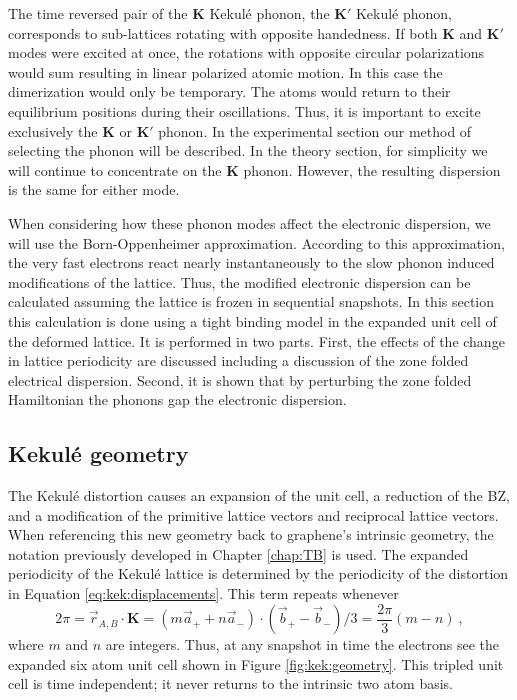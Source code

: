 The time reversed pair of the $\bm{K}$ Kekul\'e phonon, the $\bm{K'}$ Kekul\'e phonon, corresponds to sub-lattices rotating with opposite handedness.
If both $\bm{K}$ and $\bm{K'}$ modes were excited at once, the rotations with opposite circular polarizations would sum resulting in linear polarized atomic motion.
In this case the dimerization would only be temporary.
The atoms would return to their equilibrium positions during their oscillations.
Thus, it is important to excite exclusively the $\bm{K}$ or $\bm{K'}$ phonon.
In the experimental section our method of selecting the phonon will be described.
In the theory section, for simplicity we will continue to concentrate on the $\bm{K}$ phonon.
However, the resulting dispersion is the same for either mode. 

When considering how these phonon modes affect the electronic dispersion, we will use the Born-Oppenheimer approximation.
According to this approximation, the very fast electrons react nearly instantaneously to the slow phonon induced modifications of the lattice.
Thus, the modified electronic dispersion can be calculated assuming the lattice is frozen in sequential snapshots.
In this section this calculation is done using a tight binding model in the expanded unit cell of the deformed lattice.
It is performed in two parts.
First, the effects of the change in lattice periodicity are discussed including a discussion of the zone folded electrical dispersion.
Second, it is shown that by perturbing the zone folded Hamiltonian the phonons gap the electronic dispersion.

\subsection{Kekul\'e geometry}
The Kekul\'e distortion causes an expansion of the unit cell, a reduction of the BZ, and a modification of the primitive lattice vectors and reciprocal lattice vectors.
When referencing this new geometry back to graphene's intrinsic geometry, the notation previously developed in Chapter \ref{chap:TB} is used.
The expanded periodicity of the Kekul\'e lattice is determined by the periodicity of the distortion in Equation \ref{eq:kek:displacements}.
This term repeats whenever 
\begin{equation*}
	2 \pi=\vec{r}_{A,B} \cdot \bm{K}=(m \vec{a}_+ + n \vec{a}_-) \cdot (\vec{b}_+ - \vec{b}_-)/3=\frac{2 \pi}{3} (m-n) \ ,
\end{equation*}
where $m$ and $n$ are integers.
Thus, at any snapshot in time the electrons see the expanded six atom unit cell shown in Figure \ref{fig:kek:geometry}.
This tripled unit cell is time independent; it never returns to the intrinsic two atom basis. 

